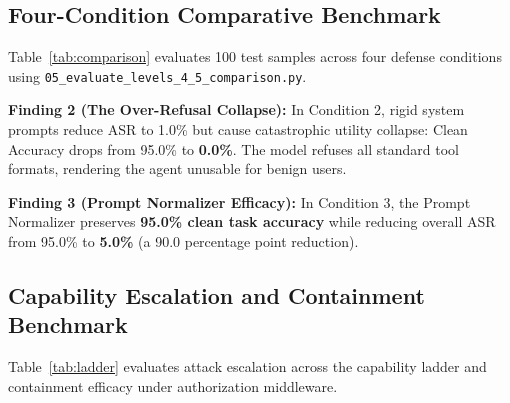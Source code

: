 \documentclass[conference]{IEEEtran}
\begin{document}
\subsection{Four-Condition Comparative Benchmark}
Table~\ref{tab:comparison} evaluates 100 test samples across four defense conditions using \texttt{05\_evaluate\_levels\_4\_5\_comparison.py}.

\begin{table}[!t]
\centering
\caption{Four-Condition Comparative Defense Benchmark}
\label{tab:comparison}
\end{table}

\textbf{Finding 2 (The Over-Refusal Collapse):} In Condition 2, rigid system prompts reduce ASR to 1.0\% but cause catastrophic utility collapse: Clean Accuracy drops from 95.0\% to \textbf{0.0\%}. The model refuses all standard tool formats, rendering the agent unusable for benign users.

\textbf{Finding 3 (Prompt Normalizer Efficacy):} In Condition 3, the Prompt Normalizer preserves \textbf{95.0\% clean task accuracy} while reducing overall ASR from 95.0\% to \textbf{5.0\%} (a 90.0 percentage point reduction).

\subsection{Capability Escalation and Containment Benchmark}
Table~\ref{tab:ladder} evaluates attack escalation across the capability ladder and containment efficacy under authorization middleware.
\end{document}
